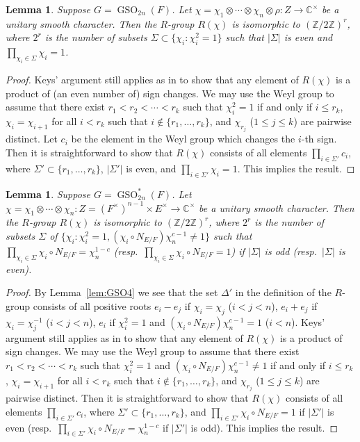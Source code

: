 \documentclass[a4paper]{amsart}
\numberwithin{equation}{section}
\newtheorem{lem}[thm]{Lemma}
\theoremstyle{remark}
\theoremstyle{definition}
\newcommand{\C}{\mathbb{C}}
\newcommand{\Z}{\mathbb{Z}}
\DeclareMathOperator{\GSO}{GSO}
\begin{document}
\begin{lem}\label{lem:R-group-GSO}
  Suppose $G = \GSO_{2n}(F)$.
  Let $\chi = \chi_{1}\otimes\cdots\otimes\chi_{n} \otimes \rho\colon Z\to \C^{\times}$ be a unitary smooth character.
  Then the $R$-group $R(\chi)$ is isomorphic to $(\Z/2\Z)^r$, where $2^r$ is the number of subsets $\Sigma \subset \{ \chi_i : \chi_i^2 = 1 \}$ such that $|\Sigma|$ is even
  and $\prod_{\chi_i \in \Sigma} \chi_i = 1$.
\end{lem}
\begin{proof}
  Keys' argument still applies as in \cite[Lemma 6.7]{MR1296726} to show that any element of $R(\chi)$ is a product of (an even number of) sign changes.
  We may use the Weyl group to assume that there exist $r_1 < r_2 < \cdots < r_k$ such that $\chi_i^2 = 1$ if and only if $i \le r_k$,
  $\chi_i = \chi_{i+1}$ for all $i < r_k$ such that $i \notin \{r_1,\dots,r_k\}$, and $\chi_{r_j}$ ($1 \le j \le k$) are pairwise distinct.
  Let $c_{i}$ be the element in the Weyl group which changes the $i$-th sign.
  Then it is straightforward to show that $R(\chi)$ consists of all elements $\prod_{i \in \Sigma'} c_i$, where $\Sigma' \subset \{r_1,\dots,r_k\}$, $|\Sigma'|$ is even, and $\prod_{i \in \Sigma'} \chi_i = 1$.
  This implies the result.
\end{proof}

\begin{lem}\label{lem:R-group-GSO-star}
  Suppose $G = \GSO_{2n}^*(F)$.
  Let $\chi = \chi_{1}\otimes\cdots\otimes\chi_{n} \colon Z = (F^\times)^{n-1} \times E^\times \to \C^{\times}$ be a unitary smooth character.
  Then the $R$-group $R(\chi)$ is isomorphic to $(\Z/2\Z)^r$, where $2^r$ is the number of subsets $\Sigma$ of $\{\chi_i : \chi_i^2=1, (\chi_i \circ N_{E/F}) \chi_n^{c-1} \ne 1 \}$ such that
      $\prod_{\chi_i \in \Sigma} \chi_i \circ N_{E/F} = \chi_n^{1-c}$ (resp.\ $\prod_{\chi_i \in \Sigma} \chi_i \circ N_{E/F} = 1$) if $|\Sigma|$ is odd (resp.\ $|\Sigma|$ is even).
\end{lem}
\begin{proof}
  By Lemma~\ref{lem:GSO4} we see that the set $\Delta'$ in the definition of the $R$-group \cite[\S1]{MR1296726} consists of
  all positive roots $e_i-e_j$ if $\chi_i=\chi_j$ ($i < j < n$), 
  $e_i+e_j$ if $\chi_i=\chi_j^{-1}$ ($i < j < n$), 
  $e_i$ if $\chi_i^2 = 1$ and $(\chi_i \circ N_{E/F})\chi_n^{c-1} = 1$ ($i < n$).
  Keys' argument still applies as in \cite[Lemma A.2]{MR3430367} to show that any element of $R(\chi)$ is a product of sign changes.
  We may use the Weyl group to assume that there exist $r_1 < r_2 < \cdots < r_k$ such that $\chi_i^2 = 1$ and $(\chi_i \circ N_{E/F})\chi_n^{c-1} \ne 1$ if and only if $i \le r_k$,
  $\chi_i = \chi_{i+1}$ for all $i < r_k$ such that $i \notin \{r_1,\dots,r_k\}$, and $\chi_{r_j}$ ($1 \le j \le k$) are pairwise distinct.
  Then it is straightforward to show that $R(\chi)$ consists of all elements $\prod_{i \in \Sigma'} c_i$, where $\Sigma' \subset \{r_1,\dots,r_k\}$, and 
  $\prod_{i \in \Sigma'} \chi_i \circ N_{E/F} = 1$ if $|\Sigma'|$ is even (resp.\ $\prod_{i \in \Sigma'} \chi_i \circ N_{E/F} = \chi_n^{1-c}$ if $|\Sigma'|$ is odd).
  This implies the result.
\end{proof}
\end{document}
